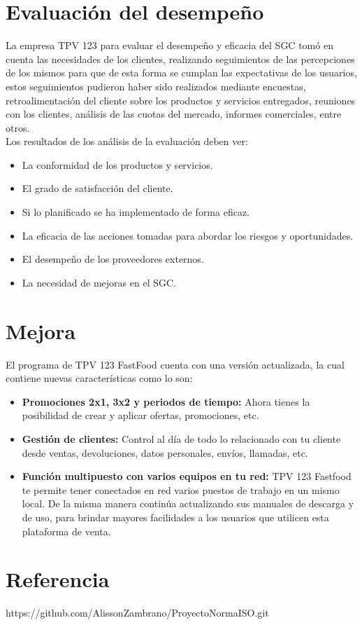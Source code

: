 \documentclass[12pt,a4paper]{article}
\begin{document}
 \par\vspace{6cm}
\section{Evaluación del desempeño}\textbf{}
La empresa TPV 123 para evaluar el desempeño y eficacia del SGC tomó en cuenta las necesidades de los clientes, realizando seguimientos de las percepciones de los mismos para que de esta forma se cumplan las expectativas de los usuarios, estos seguimientos pudieron haber sido realizados mediante encuestas, retroalimentación del cliente sobre los productos y servicios entregados, reuniones con los clientes, análisis de las cuotas del mercado, informes comerciales, entre otros.\\

Los resultados de los análisis de la evaluación deben ver:
\begin{itemize}
\item {La conformidad de los productos y servicios.}
\item {El grado de satisfacción del cliente.}
\item {Si lo planificado se ha implementado de forma eficaz.}
\item {La eficacia de las acciones tomadas para abordar los riesgos y oportunidades.}
\item {El desempeño de los proveedores externos.}
\item {La necesidad de mejoras en el SGC.}
\end{itemize}
\section{Mejora}\textbf{}
El programa de TPV 123 FastFood cuenta con una versión actualizada, la cual contiene nuevas características como lo son:\\
\begin{itemize}
\item \textbf {Promociones 2x1, 3x2 y periodos de tiempo:} Ahora tienes la posibilidad de crear y aplicar ofertas, promociones, etc.
\item \textbf {Gestión de clientes:} Control al día de todo lo relacionado con tu cliente desde ventas, devoluciones, datos personales, envíos, llamadas, etc.
\item \textbf {Función multipuesto con varios equipos en tu red:} TPV 123 Fastfood te permite tener conectados en red varios puestos de trabajo en un mismo local.
De la misma manera continúa actualizando sus manuales de descarga y de uso, para brindar mayores facilidades a los usuarios que utilicen esta plataforma de venta.
\end{itemize}
\section{Referencia}\textbf{}
https://github.com/AlissonZambrano/ProyectoNormaISO.git
\end{document}
